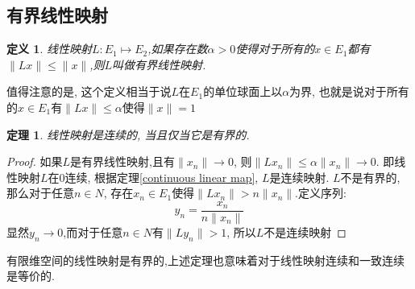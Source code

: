 \documentclass{book}
\newtheorem{definition}{\hspace{2em}定义}[section]
\newtheorem{theorem}{\hspace{2em}定理}[section]
\newtheorem{proof}{证明}[section]
\begin{document}
\subsection*{有界线性映射}
\begin{definition}
  线性映射$L:E_1\mapsto E_2$,如果存在数$\alpha>0$使得对于所有的$x\in E_1$都有$\|Lx\|\leq\|x\|$,则$L$叫做有界线性映射.
\end{definition}
值得注意的是, 这个定义相当于说$L$在$E_1$的单位球面上以$\alpha$为界, 也就是说对于所有的$x\in E_1$有$\|Lx\|\leq\alpha$使得$\|x\|=1$
\begin{theorem}
  线性映射是连续的, 当且仅当它是有界的.
\end{theorem}
\begin{proof}
  如果$L$是有界线性映射,且有$\|x_n\|\to 0$, 则$\|Lx_n\|\leq\alpha\|x_n\|\to 0$. 即线性映射$L$在$0$连续, 根据定理\ref{continuous linear map}, $L$是连续映射.
  $L$不是有界的, 那么对于任意$n\in N$, 存在$x_n\in E_1$使得$\|Lx_n\|>n\|x_n\|$.定义序列:
  \begin{equation*}
    y_n=\frac{x_n}{n\|x_n\|}
  \end{equation*}
  显然$y_n\to 0$,而对于任意$n\in N$有$\|Ly_n\|>1$, 所以$L$不是连续映射
\end{proof}
有限维空间的线性映射是有界的,上述定理也意味着对于线性映射连续和一致连续是等价的.
\end{document}
